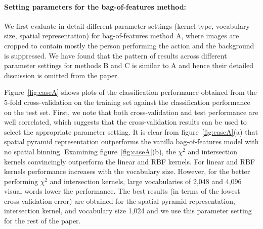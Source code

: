 \documentclass{bmvc2k}
\def\etal{\emph{et al}\bmvaOneDot}
\newcommand{\parnspc}{\vspace*{-4.2mm}}     %
\begin{document}

\parnspc
\paragraph{Setting parameters for the bag-of-features method:}
We first evaluate in detail different parameter settings (kernel type, vocabulary size, spatial representation) for bag-of-features method A, where images are cropped to contain mostly the person performing the action and the background is suppressed. We have found that the pattern of results across different parameter settings for methods B and C is similar to A and hence their detailed discussion is omitted from the paper. %

Figure~\ref{fig:caseA} shows plots of the classification performance obtained from the 5-fold cross-validation on the training set against the classification performance on the test set. First, we note that both cross-validation and test performance are well correlated, which suggests that the cross-validation results can be used to select the appropriate parameter setting. It is clear from figure~\ref{fig:caseA}(a) that spatial pyramid representation outperforms the vanilla bag-of-features model with no spatial binning. Examining figure~\ref{fig:caseA}(b), the $\chi^2$ and intersection kernels convincingly outperform the linear and RBF kernels. For linear and RBF kernels performance increases with the vocabulary size. However, for the better performing  $\chi^2$ and intersection kernels, large vocabularies of 2,048 and 4,096 visual words  lower the performance. 
The best  results (in terms of the lowest cross-validation error) are obtained for the spatial pyramid representation, intersection kernel, and vocabulary size 1,024 and we use this parameter setting for the rest of the paper.

\end{document}
